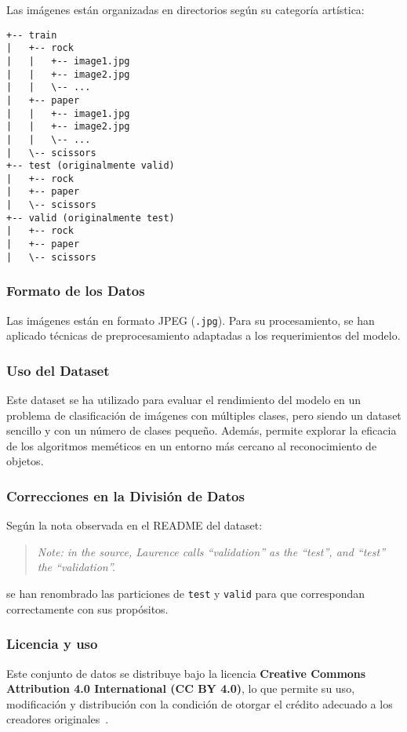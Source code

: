 Las imágenes están organizadas en directorios según su categoría artística:
\begin{verbatim}
+-- train
|   +-- rock
|   |   +-- image1.jpg
|   |   +-- image2.jpg
|   |   \-- ...
|   +-- paper
|   |   +-- image1.jpg
|   |   +-- image2.jpg
|   |   \-- ...
|   \-- scissors
+-- test (originalmente valid)
|   +-- rock
|   +-- paper
|   \-- scissors
+-- valid (originalmente test)
|   +-- rock
|   +-- paper
|   \-- scissors
\end{verbatim}


\subsubsection{Formato de los Datos}
Las imágenes están en formato JPEG (\texttt{.jpg}). Para su procesamiento, se han aplicado técnicas de preprocesamiento
adaptadas a los requerimientos del modelo.

\subsubsection{Uso del Dataset}
Este dataset se ha utilizado para evaluar el rendimiento del modelo en un problema de clasificación de imágenes con
múltiples clases, pero siendo un dataset sencillo y con un número de clases pequeño.
Además, permite explorar la eficacia de los algoritmos meméticos en un entorno más cercano al reconocimiento de objetos.

\subsubsection{Correcciones en la División de Datos}
Según la nota observada en el README del dataset:
\begin{quote}
    \textit{Note: in the source, Laurence calls ``validation'' as the ``test'', and ``test'' the ``validation''.}
\end{quote}
se han renombrado las particiones de \texttt{test} y \texttt{valid} para que correspondan correctamente con sus
propósitos.

\subsubsection{Licencia y uso}
Este conjunto de datos se distribuye bajo la licencia
\textbf{Creative Commons Attribution 4.0 International (CC BY 4.0)}, lo que permite su uso, modificación y distribución
con la condición de otorgar el crédito adecuado a los creadores originales~\cite{moroney_laurence_nodate}.


